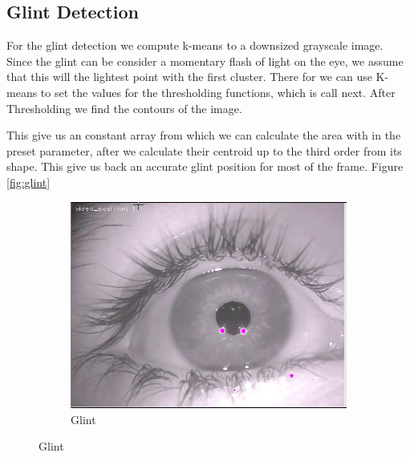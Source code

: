 \subsection{Glint Detection}

For the glint detection we compute k-means to a downsized grayscale image.  Since the glint can be consider a momentary flash of light on the eye, we assume that this will the lightest point with the first cluster. 
There for we can use K-means to set the values for the thresholding functions, which is call next. After Thresholding we find the contours of the image.

This give us an constant array from which we can calculate the area with in the preset parameter, after we calculate their centroid up to the third order from its shape. This give us back an accurate glint position for most of the frame. Figure \ref{fig:glint}

\begin{figure}[h!]
	\centering
		
	\begin{subfigure}[b]{0.5\textwidth}
		\centering
		\includegraphics[width=\textwidth]{Handin1/images/glitDetection.png}
		\caption{Glint}
		\label{subfig:glint}
	\end{subfigure}%
\end{figure}




